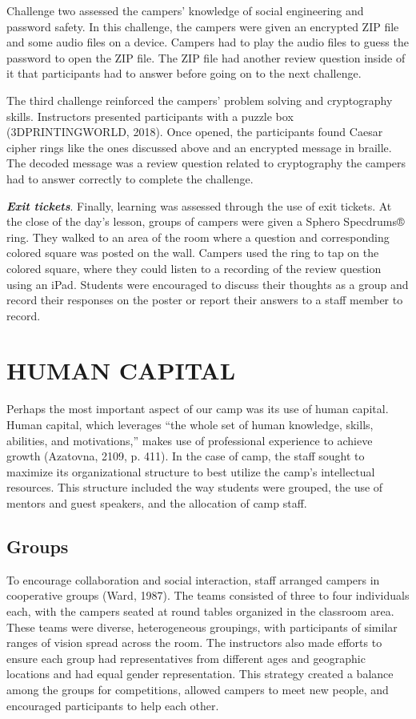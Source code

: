 \documentclass[11.5pt]{sig-alternate} %
\begin{document}
\begin{large}
Challenge two assessed the campers’ knowledge of social engineering and password safety. In this challenge, the campers were given an encrypted ZIP file and some audio files on a device. Campers had to play the audio files to guess the password to open the ZIP file. The ZIP file had another review question inside of it that participants had to answer before going on to the next challenge.

The third challenge reinforced the campers’ problem solving and cryptography skills. Instructors presented participants with a puzzle box (3DPRINTINGWORLD, 2018). Once opened, the participants found Caesar cipher rings like the ones discussed above and an encrypted message in braille. The decoded message was a review question related to cryptography the campers had to answer correctly to complete the challenge. 

\textbf{\textit{Exit tickets}}. Finally, learning was assessed through the use of exit tickets. At the close of the day’s lesson, groups of campers were given a Sphero Specdrums® ring. They walked to an area of the room where a question and corresponding colored square was posted on the wall. Campers used the ring to tap on the colored square, where they could listen to a recording of the review question using an iPad. Students were encouraged to discuss their thoughts as a group and record their responses on the poster or report their answers to a staff member to record.

\section*{HUMAN CAPITAL}

Perhaps the most important aspect of our camp was its use of human capital. Human capital, which leverages “the whole set of human knowledge, skills, abilities, and motivations,” makes use of professional experience to achieve growth (Azatovna, 2109, p. 411). In the case of camp, the staff sought to maximize its organizational structure to best utilize the camp’s intellectual resources. This structure included the way students were grouped, the use of mentors and guest speakers, and the allocation of camp staff.

\subsection*{Groups}

To encourage collaboration and social interaction, staff arranged campers in cooperative groups (Ward, 1987). The teams consisted of three to four individuals each, with the campers seated at round tables organized in the classroom area. These teams were diverse, heterogeneous groupings, with participants of similar ranges of vision spread across the room. The instructors also made efforts to ensure each group had representatives from different ages and geographic locations and had equal gender representation. This strategy created a balance among the groups for competitions, allowed campers to meet new people, and encouraged participants to help each other.


\end{large}
\end{document}

